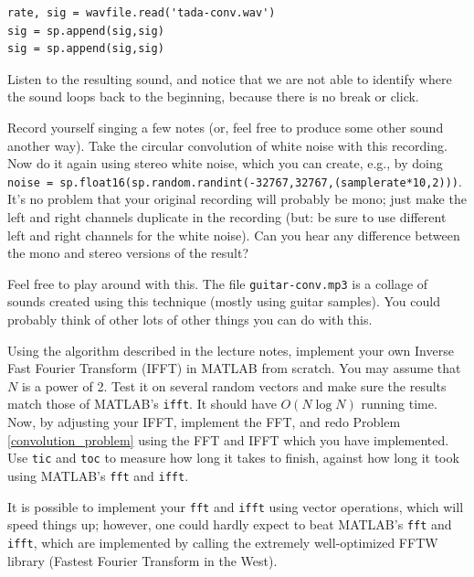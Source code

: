 \begin{lstlisting}
rate, sig = wavfile.read('tada-conv.wav')
sig = sp.append(sig,sig)
sig = sp.append(sig,sig)
\end{lstlisting}

Listen to the resulting sound, and notice that we are not able to identify where the sound loops back to the beginning, because there is no break or click.

\begin{problem}
Record yourself singing a few notes (or, feel free to produce some other sound another way). Take the circular convolution of white noise with this recording. Now do it again using stereo white noise, which you can create, e.g., by doing \texttt{noise = sp.float16(sp.random.randint(-32767,32767,(samplerate*10,2)))}. It's no problem that your original recording will probably be mono; just make the left and right channels duplicate in the recording (but: be sure to use different left and right channels for the white noise). Can you hear any difference between the mono and stereo versions of the result?
\end{problem}

Feel free to play around with this. The file \texttt{guitar-conv.mp3} is a collage of sounds created using this technique (mostly using guitar samples). You could probably think of other lots of other things you can do with this.



\begin{problem}
Using the algorithm described in the lecture notes, implement your own Inverse Fast Fourier Transform (IFFT) in MATLAB from scratch. You may assume that $N$ is a power of 2. Test it on several random vectors and make sure the results match those of MATLAB's \texttt{ifft}. It should have $O(N\log N)$ running time. Now, by adjusting your IFFT, implement the FFT, and redo Problem \ref{convolution_problem} using the FFT and IFFT which you have implemented. Use \texttt{tic} and \texttt{toc} to measure how long it takes to finish, against how long it took using MATLAB's \texttt{fft} and \texttt{ifft}.
\end{problem}

It is possible to implement your \texttt{fft} and \texttt{ifft} using vector operations, which will speed things up; however, one could hardly expect to beat MATLAB's \texttt{fft} and \texttt{ifft}, which are implemented by calling the extremely well-optimized FFTW library (Fastest Fourier Transform in the West).



